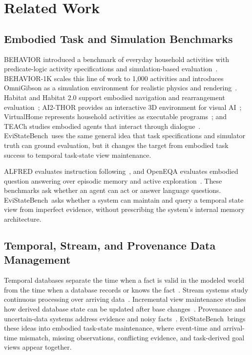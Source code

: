 \documentclass[conference]{IEEEtran}
\newcommand{\bench}{EviStateBench}
\begin{document}
\section{Related Work}
\label{sec:related}

\subsection{Embodied Task and Simulation Benchmarks}

BEHAVIOR introduced a benchmark of everyday household activities with predicate-logic activity specifications and simulation-based evaluation~\cite{srivastava2022behavior}. BEHAVIOR-1K scales this line of work to 1,000 activities and introduces OmniGibson as a simulation environment for realistic physics and rendering~\cite{li2024behavior1k}. Habitat and Habitat 2.0 support embodied navigation and rearrangement evaluation~\cite{savva2019habitat,szot2021habitat}; AI2-THOR provides an interactive 3D environment for visual AI~\cite{kolve2017ai2thor}; VirtualHome represents household activities as executable programs~\cite{puig2018virtualhome}; and TEACh studies embodied agents that interact through dialogue~\cite{padmakumar2022teach}. \bench\ uses the same general idea that task specifications and simulator truth can ground evaluation, but it changes the target from embodied task success to temporal task-state view maintenance.

ALFRED evaluates instruction following~\cite{shridhar2020alfred}, and OpenEQA evaluates embodied question answering over episodic memory and active exploration~\cite{majumdar2024openeqa}. These benchmarks ask whether an agent can act or answer language questions. \bench\ asks whether a system can maintain and query a temporal state view from imperfect evidence, without prescribing the system's internal memory architecture.

\subsection{Temporal, Stream, and Provenance Data Management}

Temporal databases separate the time when a fact is valid in the modeled world from the time when a database records or knows the fact~\cite{snodgrass1999developing,jensen1999temporal}. Stream systems study continuous processing over arriving data~\cite{babcock2002models,garofalakis2016data}. Incremental view maintenance studies how derived database state can be updated after base changes~\cite{gupta1995maintenance,zhuge1995view}. Provenance and uncertain-data systems address evidence and noisy facts~\cite{green2007provenance,cheney2009provenance,aggarwal2009uncertain,dalvi2007efficient}. \bench\ brings these ideas into embodied task-state maintenance, where event-time and arrival-time mismatch, missing observations, conflicting evidence, and task-derived goal views appear together.
\end{document}
